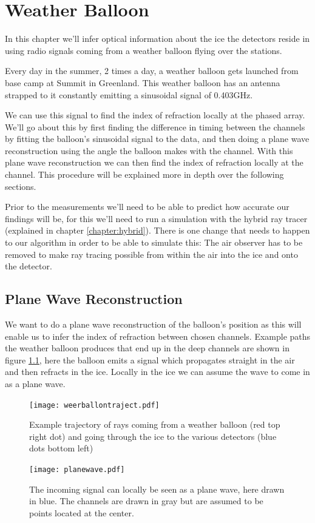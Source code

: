 \chapter{Weather Balloon}
\label{chap:WB}
In this chapter we'll infer optical information about the ice the detectors reside in
using radio signals coming from a weather balloon flying over the stations. 

Every day in the summer, 2 times a day, a weather balloon gets launched
from base camp at Summit in Greenland. This weather balloon has an antenna
strapped to it constantly emitting a sinusoidal signal of 0.403GHz.

We can use this signal to find the index of refraction locally at the phased
array.  We'll go about this by first finding the difference in timing between the
channels by fitting the balloon's sinusoidal signal to the data, and then doing
a plane wave reconstruction using the angle the balloon makes with the channel.
With this plane wave reconstruction we can then find the index of refraction locally at the channel.  This procedure will
be explained more in depth over the following sections.

Prior to the measurements we'll need to be able to predict how accurate our
findings will be, for this we'll need to run a simulation with the hybrid ray
tracer (explained in chapter \ref{chapter:hybrid}).  
There is one change that needs to happen to our algorithm in order
to be able to simulate this: The air observer has to be removed to make
ray tracing possible from within the air into the ice and onto the detector\cite{hybrid}.

\section{Plane Wave Reconstruction}
We want to do a plane wave reconstruction of the balloon's position as this
will enable us to infer the index of refraction between chosen channels.
Example paths the weather balloon produces that end up in the deep channels are
shown in figure \ref{fig:Example trajectory}, here the balloon emits a signal
which propagates straight in the air and then refracts in the ice. Locally in
the ice we can assume the wave to come in as a plane wave.
\begin{figure}
	\centering
	\texttt{[image: weerballontraject.pdf]}
	\caption{Example trajectory of rays coming from a weather balloon (red top right dot) and going through the ice to the various detectors (blue dots bottom left)}
	\label{fig:Example trajectory}
\end{figure}
\begin{figure}
	\centering
	\texttt{[image: planewave.pdf]}
	\caption{The incoming signal can locally be seen as a plane wave, here drawn in blue. The channels are drawn in gray but are assumed to be points located at the center.}	
	\label{fig:Plane Wave}
\end{figure}

